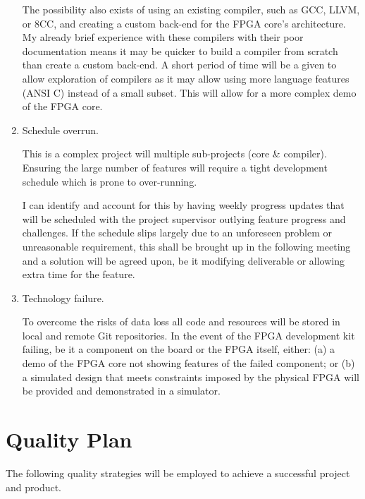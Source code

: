 \documentclass[11pt,a4paper]{article}
\begin{document}
\begin{enumerate}
{The possibility also exists of using an existing compiler, such as GCC, LLVM, or 8CC, and creating a custom back-end for the FPGA core's architecture. My already brief experience with these compilers with their poor documentation means it may be quicker to build a compiler from scratch than create a custom back-end. A short period of time will be a given to allow exploration of compilers as it may allow using more language features (ANSI C) instead of a small subset. This will allow for a more complex demo of the FPGA core.
}

\item{
Schedule overrun. 

This is a complex project will multiple sub-projects (core \& compiler). Ensuring the large number of features will require a tight development schedule which is prone to over-running.

I can identify and account for this by having weekly progress updates that will be scheduled with the project supervisor outlying feature progress and challenges. If the schedule slips largely due to an unforeseen problem or unreasonable requirement, this shall be brought up in the following meeting and a solution will be agreed upon, be it modifying deliverable or allowing extra time for the feature.
}

\item{Technology failure. 

To overcome the risks of data loss all code and resources will be stored in local and remote Git repositories.
In the event of the FPGA development kit failing, be it a component on the board or the FPGA itself, either: (a) a demo of the FPGA core not showing features of the failed component; or (b) a simulated design that meets constraints imposed by the physical FPGA will be provided and demonstrated in a simulator.
}
\end{enumerate}


\section{Quality Plan}
The following quality strategies will be employed to achieve a successful project and product.
\end{document}
